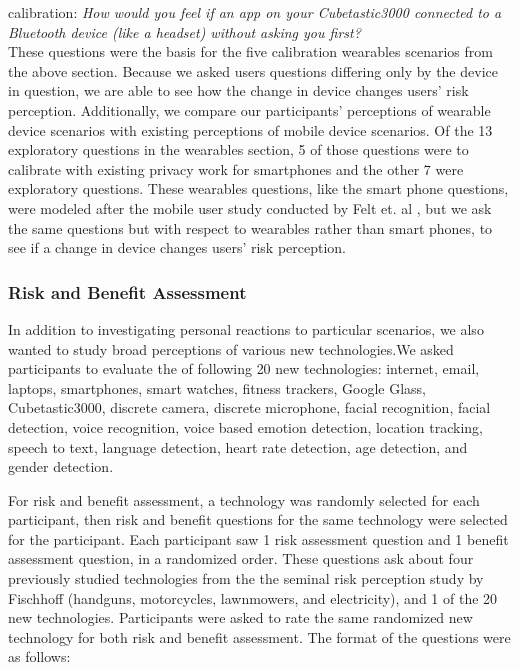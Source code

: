 \documentclass{acm_proc_article-sp}
\begin{document}
calibration: \textit{How would you feel if an app on your Cubetastic3000 connected to a Bluetooth device (like a headset) without asking you first?} \\[-.5cm]

These questions were the basis for the five calibration wearables scenarios from the above section. Because we asked users questions differing only by the device in question, we are able to see how the change in device changes users' risk perception. Additionally, we compare our participants' perceptions of wearable device scenarios with existing perceptions of mobile device scenarios. Of the 13 exploratory questions in the wearables section, 5 of those questions were to calibrate with existing privacy work for smartphones and the other 7  were exploratory questions. These wearables questions, like the smart phone questions, were modeled after the mobile user study conducted by Felt et. al \cite{Felt}, but we ask the same questions but with respect to wearables rather than smart phones, to see if a change in device changes users' risk perception.


\subsubsection{Risk and Benefit Assessment}

In addition to investigating personal reactions to particular scenarios, we also wanted to study broad perceptions of various new technologies.We asked participants to evaluate the of following 20 new technologies: internet, email, laptops, smartphones, smart watches, fitness trackers, Google Glass, Cubetastic3000, discrete camera, discrete microphone, facial recognition, facial detection, voice recognition, voice based emotion detection, location tracking, speech to text, language detection, heart rate detection, age detection, and gender detection. 

For risk and benefit assessment, a technology was randomly selected for each participant, then risk and benefit questions for the same technology were selected for the participant. Each participant saw 1 risk assessment question and 1 benefit assessment question, in a randomized order. These questions ask about four previously studied technologies from the the seminal risk perception study by Fischhoff \cite{Fischhoff} (handguns, motorcycles, lawnmowers, and electricity), and 1 of the 20 new technologies.  Participants were asked to rate the same randomized new technology for both risk and benefit assessment. The format of the questions were as follows:
\end{document}
